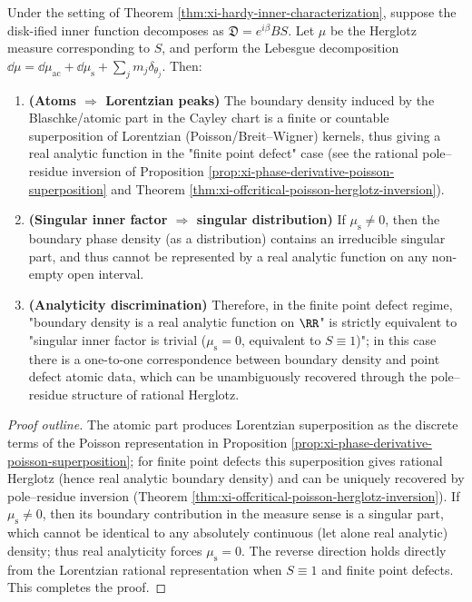 \begin{proposition}\label{prop:xi-analytic-boundary-density-iff-no-singular-inner}
Under the setting of Theorem \ref{thm:xi-hardy-inner-characterization}, suppose the disk-ified inner function decomposes as
\(
\mathfrak{D}=e^{i\beta}BS
\).
Let \(\mu\) be the Herglotz measure corresponding to \(S\), and perform the Lebesgue decomposition
\(
\dd\mu=\dd\mu_{\mathrm{ac}}+\dd\mu_{\mathrm{s}}+\sum_j m_j\delta_{\theta_j}
\).
Then:
\begin{enumerate}
  \item \textbf{(Atoms \(\Rightarrow\) Lorentzian peaks)}
  The boundary density induced by the Blaschke/atomic part in the Cayley chart is a finite or countable superposition of Lorentzian (Poisson/Breit--Wigner) kernels,
  thus giving a real analytic function in the "finite point defect" case (see the rational pole--residue inversion of Proposition \ref{prop:xi-phase-derivative-poisson-superposition} and Theorem \ref{thm:xi-offcritical-poisson-herglotz-inversion}).
  \item \textbf{(Singular inner factor \(\Rightarrow\) singular distribution)}
  If \(\mu_{\mathrm{s}}\neq 0\), then the boundary phase density (as a distribution) contains an irreducible singular part, and thus cannot be represented by a real analytic function on any non-empty open interval.
  \item \textbf{(Analyticity discrimination)}
  Therefore, in the finite point defect regime,
  "boundary density is a real analytic function on \(\RR\)" is strictly equivalent to "singular inner factor is trivial (\(\mu_{\mathrm{s}}=0\), equivalent to \(S\equiv 1\))";
  in this case there is a one-to-one correspondence between boundary density and point defect atomic data, which can be unambiguously recovered through the pole--residue structure of rational Herglotz.
\end{enumerate}
\end{proposition}

\begin{proof}[Proof outline]
The atomic part produces Lorentzian superposition as the discrete terms of the Poisson representation in Proposition \ref{prop:xi-phase-derivative-poisson-superposition};
for finite point defects this superposition gives rational Herglotz (hence real analytic boundary density) and can be uniquely recovered by pole--residue inversion (Theorem \ref{thm:xi-offcritical-poisson-herglotz-inversion}).
If \(\mu_{\mathrm{s}}\neq 0\), then its boundary contribution in the measure sense is a singular part, which cannot be identical to any absolutely continuous (let alone real analytic) density;
thus real analyticity forces \(\mu_{\mathrm{s}}=0\).
The reverse direction holds directly from the Lorentzian rational representation when \(S\equiv 1\) and finite point defects. This completes the proof.
\end{proof}

